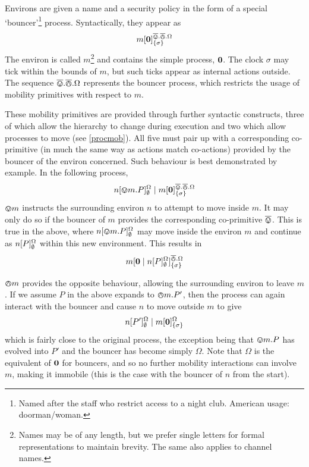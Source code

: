 \documentclass{acm_proc_article-sp}
\begin{document}
Environs are given a name and a security policy in the form of a special
`bouncer'\footnote{Named after the staff who restrict access to a night
club.  American usage: doorman/woman.} process.  Syntactically, they
appear as
\begin{displaymath}
{m}[ \textbf{0} ]^{\overline{\varovee}.\overline{\varowedge}.\Omega}_{\{\sigma\}}
\end{displaymath}
The environ is called $m$\footnote{Names may be of any length, but we
 prefer single letters for formal representations to maintain brevity.
 The same also applies to channel names.} and contains the simple
 process, $\textbf{0}$.  The clock $\sigma$ may tick within the bounds of $m$,
 but such ticks appear as internal actions outside.  The sequence
 $\overline{\varovee}.\overline{\varowedge}.\Omega$ represents the bouncer process, which restricts the
 usage of mobility primitives with respect to $m$.

These mobility primitives are provided through further syntactic
 constructs, three of which allow the hierarchy to change during
 execution and two which allow processes to move (see \ref{procmob}).
 All five must pair up with a corresponding co-primitive (in much the
 same way as actions match co-actions) provided by the bouncer of the
 environ concerned.  Such behaviour is best demonstrated by example.
 In the following process,
\begin{displaymath}
{n}[ \varovee m.P ]^{\Omega}_{\emptyset} \mid {m}[ \textbf{0} ]^{\overline{\varovee}.\overline{\varowedge}.\Omega}_{\{\sigma\}}
\end{displaymath}
$\varovee m$ instructs the surrounding environ $n$ to attempt to move
inside $m$.  It may only do so if the bouncer of $m$ provides the
corresponding co-primitive $\overline{\varovee}$.  This is true in the above, where
${n}[ \varovee m.P ]^{\Omega}_{\emptyset}$ may move inside the environ
$m$ and continue as ${n}[ P ]^{\Omega}_{\emptyset}$ within this new
environment.  This results in
\begin{displaymath}
{m}[ \textbf{0} \mid {n}[ P ]^{\Omega}_{\emptyset} ]^{\overline{\varowedge}.\Omega}_{\{\sigma\}}
\end{displaymath}

$\varowedge m$ provides the opposite behaviour, allowing the surrounding
environ to leave $m$.  If we assume $P$ in the above expands to
$\varowedge m.P'$, then the process can again interact with the bouncer
and cause $n$ to move outside $m$ to give
\begin{displaymath}
{n}[ P' ]^{\Omega}_{\emptyset} \mid {m}[ \textbf{0} ]^{\Omega}_{\{\sigma\}}
\end{displaymath}
which is fairly close to the original process, the exception being that
$\varovee m.P$ has evolved into $P'$ and the bouncer has become simply
$\Omega$.  Note that $\Omega$ is the equivalent of $\textbf{0}$ for bouncers,
and so no further mobility interactions can involve $m$, making it
immobile (this is the case with the bouncer of $n$ from the start).
\end{document}
